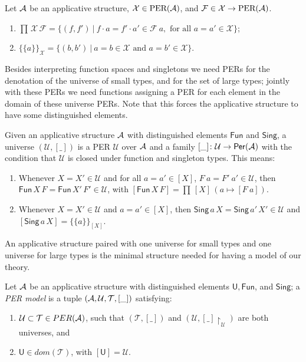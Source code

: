 \documentclass{LMCS}
\theoremstyle{plain}\newtheorem{satz}[thm]{Satz}
\newcommand{\into}{\rightarrow}
\newcommand{\F}[2]{\mathsf{Fun}\,#1\,#2}
\newcommand{\calX}{\mathcal{X}}
\newcommand{\calF}{\mathcal{F}}
\newcommand{\singD}[2]{\{\!\!\{#1\}\!\!\}_{#2}}
\newcommand{\perU}{\mathcal{U}}
\newcommand{\perT}{\mathcal{T}}
\newcommand{\Per}{\mathsf{Per}}
\newcommand{\iU}{\mathsf{U}}
\newcommand{\iSing}[2]{\mathsf{Sing}\,#1\,{#2}}
\begin{document}
{\begin{defi} Let $\mathcal{A}$ be an applicative structure,
  $\calX\in\per{\calA}$, and $\calF\in \calX\into \per{\calA}$.
  \begin{enumerate}[(1)]
  \item $\prod\,\calX\,\calF = \{(f,f')\ |\ f\cdot a = f'\cdot a' \in \calF\ a,
    \mbox{ for all } a = a' \in \calX\}$;
  \item $\singD{a}{\calX} = \{(b,b')\ |\ a = b \in \calX \mbox{ and } a = b'
    \in \calX\}$.
  \end{enumerate}
\end{defi}

 Besides interpreting function spaces and singletons we need PERs for
the denotation of the universe of small types, and for the set of
large types; jointly with these PERs we need functions assigning a PER
for each element in the domain of these universe PERs. Note that this
forces the applicative structure to have some distinguished elements.


\begin{defi}[Universe]
  Given an applicative structure $\mathcal{A}$ with distinguished elements
  $\mathsf{Fun}$ and $\mathsf{Sing}$, a universe $(\perU, [\_])$ is a
  PER $\perU$ over $\mathcal{A}$ and a family $[\_] \colon \perU \into \Per(\calA)$
  with the condition that $\perU$ is closed under function and 
  singleton types.  This means:
  \begin{enumerate}[(1)]
  \item Whenever $X = X' \in \perU$ and
    for all $a = a' \in [X]$, $F\ a = F'\ a' \in \perU$, then $\F{X}{F}
    = \F{X'}{F'} \in \perU$, with $[\F{X}{F}] = \prod\,[X]\,(a \mapsto [F\ a])$.
  \item Whenever $X = X' \in \perU$ and $a = a' \in [X]$, then $\iSing a
    X = \iSing{a'}{X'} \in \perU$ and $[\iSing a X] = \singD{a}{[X]}$.
  \end{enumerate}
\end{defi}\medskip

\noindent An applicative structure paired with one universe for small
types and one universe for large types is the minimal structure needed
for having a model of our theory.

\begin{defi}
  Let $\mathcal{A}$ be an applicative structure with distinguished 
  elements $\iU,\mathsf{Fun}$, and $\mathsf{Sing}$; a {\em
    PER model} is a tuple $(\calA,\perU,\perT,[\_])$ satisfying:
  \begin{enumerate}[(1)]
  \item $\perU\subset \perT \in PER(\calA)$, such that
    $(\perT,[\_])$ and $(\perU, [\_] \!\restriction_{\perU})$ are
    both universes, and
  \item $\iU \in dom(\perT)$, with $[\iU] = \perU$.
  \end{enumerate}
\end{defi}

}
\end{document}
